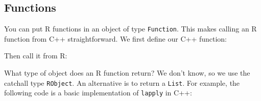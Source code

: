 \begin{Shaded}
\begin{Highlighting}[]
\StringTok{ }\StringTok{ } 
\end{Highlighting}
\end{Shaded}

\subsection{Functions}\label{functions-rcpp}

You can put R functions in an object of type \texttt{Function}. This
makes calling an R function from C++ straightforward. We first define
our C++ function: 

\begin{Shaded}
\begin{Highlighting}[]
  

   \NormalTok{);}
\NormalTok{\}}
\end{Highlighting}
\end{Shaded}

Then call it from R:

\begin{Shaded}
\begin{Highlighting}[]
\StringTok{ }\NormalTok{)}
\end{Highlighting}
\end{Shaded}

What type of object does an R function return? We don't know, so we use
the catchall type \texttt{RObject}. An alternative is to return a
\texttt{List}. For example, the following code is a basic implementation
of \texttt{lapply} in C++:

\begin{Shaded}
\begin{Highlighting}[]
  

   

  \NormalTok{(} 
  \NormalTok{\}}

   
\NormalTok{\}}
\end{Highlighting}
\end{Shaded}

